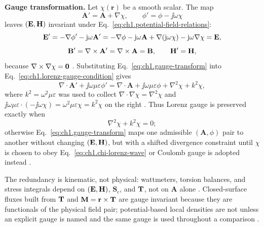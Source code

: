 \textbf{Gauge transformation.} Let $\chi(\mathbf{r})$ be a smooth scalar. The map
\begin{equation}
\label{eq:ch1.gauge-transform}
\mathbf{A}'=\mathbf{A}+\nabla\chi,\qquad
\phi'=\phi-\jj\omega\chi
\end{equation}
leaves $(\mathbf{E},\mathbf{H})$ invariant under Eq.~\eqref{eq:ch1.potential-field-relations}:
\begin{equation}
\label{eq:ch1.gauge-E-invariant}
\mathbf{E}'
=-\nabla\phi'-\mathrm{j}\omega\mathbf{A}'
=-\nabla\phi-\mathrm{j}\omega\mathbf{A}
+\nabla(\mathrm{j}\omega\chi)-\mathrm{j}\omega\nabla\chi
=\mathbf{E},
\end{equation}
\begin{equation}
\label{eq:ch1.gauge-H-invariant}
\mathbf{B}'=\nabla\times\mathbf{A}'=\nabla\times\mathbf{A}=\mathbf{B},
\qquad
\mathbf{H}'=\mathbf{H},
\end{equation}
because $\nabla\times\nabla\chi=\mathbf{0}$ \cite{maxwell1873,stratton1941,jackson1999}. Substituting Eq.~\eqref{eq:ch1.gauge-transform} into Eq.~\eqref{eq:ch1.lorenz-gauge-condition} gives
\begin{equation}
\label{eq:ch1.lorenz-gauge-transform-shift}
\nabla\cdot\mathbf{A}'+\jj\omega\mu\varepsilon\phi'
=\nabla\cdot\mathbf{A}+\jj\omega\mu\varepsilon\phi+\nabla^2\chi+k^2\chi,
\end{equation}
where $k^2=\omega^2\mu\varepsilon$ was used to collect $\nabla\cdot\nabla\chi=\nabla^2\chi$ and $\jj\omega\mu\varepsilon\cdot(-\jj\omega\chi)=\omega^2\mu\varepsilon\chi=k^2\chi$ on the right \cite{stratton1941}. Thus Lorenz gauge is preserved exactly when
\begin{equation}
\label{eq:ch1.chi-lorenz-wave}
\nabla^2\chi+k^2\chi=0;
\end{equation}
otherwise Eq.~\eqref{eq:ch1.gauge-transform} maps one admissible $(\mathbf{A},\phi)$ pair to another without changing $(\mathbf{E},\mathbf{H})$, but with a shifted divergence constraint until $\chi$ is chosen to obey Eq.~\eqref{eq:ch1.chi-lorenz-wave} or Coulomb gauge is adopted instead \cite{stratton1941,jackson1999}.

The redundancy is kinematic, not physical: wattmeters, torsion balances, and stress integrals depend on $(\mathbf{E},\mathbf{H})$, $\mathbf{S}_\mathrm{c}$, and $\mathbf{T}$, not on $\mathbf{A}$ alone \cite{maxwell1873,beth1936,stratton1941}. Closed-surface fluxes built from $\mathbf{T}$ and $\mathbf{M}=\mathbf{r}\times\mathbf{T}$ are gauge invariant because they are functionals of the physical field pair; potential-based local densities are not unless an explicit gauge is named and the same gauge is used throughout a comparison \cite{belinfante1940}.


